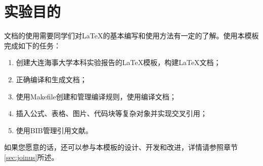 \chapter{实验目的}

文档的使用需要同学们对\LaTeX 的基本编写和使用方法有一定的了解。使用本模板完成如下的任务：

\begin{enumerate}
    \item 创建大连海事大学本科实验报告的\LaTeX 模板，构建\LaTeX 文档；
    \item 正确编译和生成文档；
    \item 使用Makefile创建和管理编译规则，使用\XeLaTeX 编译文档；
    \item 插入公式、表格、图片、代码块等复杂对象并实现交叉引用；
    \item 使用BIB管理引用文献。
\end{enumerate}

如果您愿意的话，还可以参与本模板的设计、开发和改进，详情请参照章节\ref{sec:joinus}所述。